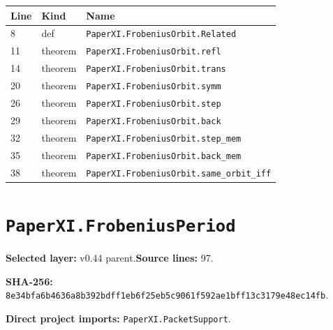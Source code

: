 \documentclass[10pt,oneside]{book}
\begin{document}
\begin{longtable}{@{}p{}p{}p{}@{}}\toprule Line&Kind&Name\\\midrule\endhead

8&def&\nolinkurl{PaperXI.FrobeniusOrbit.Related}\\

11&theorem&\nolinkurl{PaperXI.FrobeniusOrbit.refl}\\

14&theorem&\nolinkurl{PaperXI.FrobeniusOrbit.trans}\\

20&theorem&\nolinkurl{PaperXI.FrobeniusOrbit.symm}\\

26&theorem&\nolinkurl{PaperXI.FrobeniusOrbit.step}\\

29&theorem&\nolinkurl{PaperXI.FrobeniusOrbit.back}\\

32&theorem&\nolinkurl{PaperXI.FrobeniusOrbit.step_mem}\\

35&theorem&\nolinkurl{PaperXI.FrobeniusOrbit.back_mem}\\

38&theorem&\nolinkurl{PaperXI.FrobeniusOrbit.same_orbit_iff}\\

\bottomrule\end{longtable}

\section{\texorpdfstring{\nolinkurl{PaperXI.FrobeniusPeriod}}{PaperXI.FrobeniusPeriod}}\label{module:PaperXI.FrobeniusPeriod}

\textbf{Selected layer:} v0.44 parent.\quad\textbf{Source lines:} 97.\par\textbf{SHA-256:} {\scriptsize\nolinkurl{8e34bfa6b4636a8b392bdff1eb6f25eb5c9061f592ae1bff13c3179e48ec14fb}}.


\textbf{Direct project imports:} \nolinkurl{PaperXI.PacketSupport}.
\end{document}
